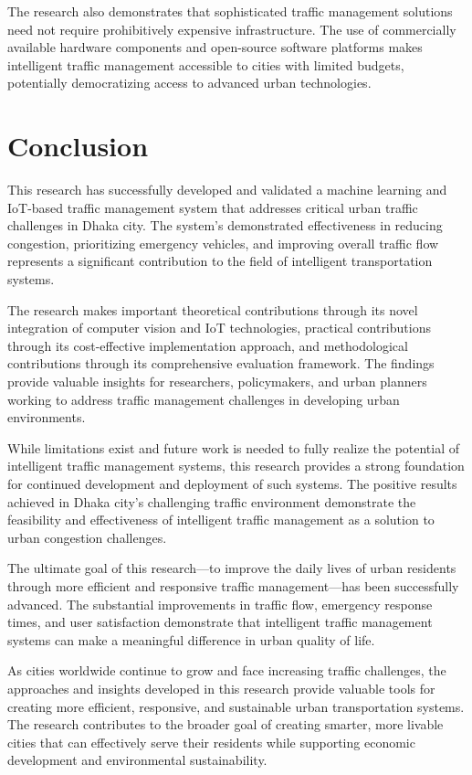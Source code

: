 The research also demonstrates that sophisticated traffic management solutions need not require prohibitively expensive infrastructure. The use of commercially available hardware components and open-source software platforms makes intelligent traffic management accessible to cities with limited budgets, potentially democratizing access to advanced urban technologies.

\section{Conclusion}
\label{sec:final_conclusion}

This research has successfully developed and validated a machine learning and IoT-based traffic management system that addresses critical urban traffic challenges in Dhaka city. The system's demonstrated effectiveness in reducing congestion, prioritizing emergency vehicles, and improving overall traffic flow represents a significant contribution to the field of intelligent transportation systems.

The research makes important theoretical contributions through its novel integration of computer vision and IoT technologies, practical contributions through its cost-effective implementation approach, and methodological contributions through its comprehensive evaluation framework. The findings provide valuable insights for researchers, policymakers, and urban planners working to address traffic management challenges in developing urban environments.

While limitations exist and future work is needed to fully realize the potential of intelligent traffic management systems, this research provides a strong foundation for continued development and deployment of such systems. The positive results achieved in Dhaka city's challenging traffic environment demonstrate the feasibility and effectiveness of intelligent traffic management as a solution to urban congestion challenges.

The ultimate goal of this research—to improve the daily lives of urban residents through more efficient and responsive traffic management—has been successfully advanced. The substantial improvements in traffic flow, emergency response times, and user satisfaction demonstrate that intelligent traffic management systems can make a meaningful difference in urban quality of life.

As cities worldwide continue to grow and face increasing traffic challenges, the approaches and insights developed in this research provide valuable tools for creating more efficient, responsive, and sustainable urban transportation systems. The research contributes to the broader goal of creating smarter, more livable cities that can effectively serve their residents while supporting economic development and environmental sustainability.

